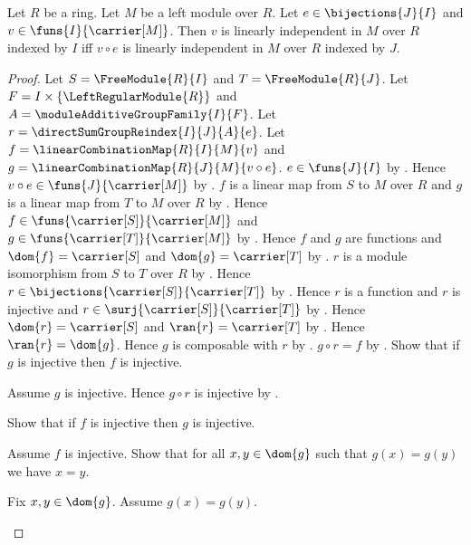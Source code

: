 \begin{theorem}\label{indexed_module_linear_independence_reindex}
    Let $R$ be a ring.
    Let $M$ be a left module over $R$.
    Let $e\in\bijections{J}{I}$ and
        $v\in\funs{I}{\carrier[M]}$.
    Then $v$ is linearly independent in $M$ over $R$ indexed by $I$ iff
        $v\circ e$ is linearly independent in $M$ over $R$ indexed by $J$.
\end{theorem}
\begin{proof}
    Let $S=\FreeModule{R}{I}$ and $T=\FreeModule{R}{J}$.
    Let $F=I\times\{\LeftRegularModule{R}\}$ and
        $A=\moduleAdditiveGroupFamily{I}{F}$.
    Let $r=\directSumGroupReindex{I}{J}{A}{e}$.
    Let $f=\linearCombinationMap{R}{I}{M}{v}$ and
        $g=\linearCombinationMap{R}{J}{M}{v\circ e}$.
    $e\in\funs{J}{I}$ by .
    Hence $v\circ e\in\funs{J}{\carrier[M]}$ by
        .
    $f$ is a linear map from $S$ to $M$ over $R$ and
        $g$ is a linear map from $T$ to $M$ over $R$ by
        .
    Hence $f\in\funs{\carrier[S]}{\carrier[M]}$ and
        $g\in\funs{\carrier[T]}{\carrier[M]}$ by
        .
    Hence $f$ and $g$ are functions and
        $\dom{f}=\carrier[S]$ and $\dom{g}=\carrier[T]$ by
        .
    $r$ is a module isomorphism from $S$ to $T$ over $R$ by
        .
    Hence $r\in\bijections{\carrier[S]}{\carrier[T]}$ by
        .
    Hence $r$ is a function and $r$ is injective and
        $r\in\surj{\carrier[S]}{\carrier[T]}$ by
        .
    Hence $\dom{r}=\carrier[S]$ and $\ran{r}=\carrier[T]$ by
        .
    Hence $\ran{r}=\dom{g}$.
    Hence $g$ is composable with $r$ by .
    $g\circ r=f$ by .
    Show that if $g$ is injective then $f$ is injective.
    \begin{subproof}
        Assume $g$ is injective.
        Hence $g\circ r$ is injective by .
    \end{subproof}
    Show that if $f$ is injective then $g$ is injective.
    \begin{subproof}
        Assume $f$ is injective.
        Show that for all $x,y\in\dom{g}$ such that $g(x)=g(y)$
            we have $x=y$.
        \begin{subproof}
            Fix $x,y\in\dom{g}$.
            Assume $g(x)=g(y)$.

\end{subproof}
\end{subproof}
\end{proof}
